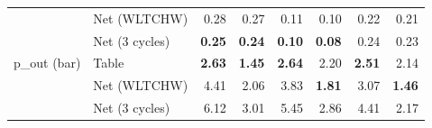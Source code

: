 \begin{table}[t]
\begin{tabular}{llrrrrrr}
 & Net (WLTCHW) & 0.28 & 0.27 & 0.11 & 0.10 & 0.22 & 0.21 \\
 & Net (3 cycles) & \textbf{0.25} & \textbf{0.24} & \textbf{0.10} & \textbf{0.08} & 0.24 & 0.23 \\
\addlinespace
p\_out (bar) & Table & \textbf{2.63} & \textbf{1.45} & \textbf{2.64} & 2.20 & \textbf{2.51} & 2.14 \\
 & Net (WLTCHW) & 4.41 & 2.06 & 3.83 & \textbf{1.81} & 3.07 & \textbf{1.46} \\
 & Net (3 cycles) & 6.12 & 3.01 & 5.45 & 2.86 & 4.41 & 2.17 \\
\bottomrule
\end{tabular}
\end{table}
